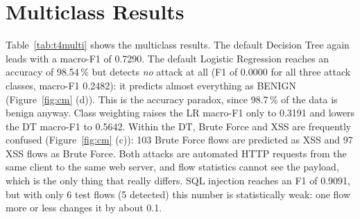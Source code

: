 \begin{table}[ht]
	\centering\small
	\resizebox{\linewidth}{!}{}
	\caption{Binary results on the test split (Prec., Rec., F1 refer to the attack class; FP/FN are false positives and false negatives). Best model in bold.}
	\label{tab:t4binary}
\end{table}

\section{Multiclass Results}\label{sec:ml-multi}

Table~\ref{tab:t4multi} shows the multiclass results. The default Decision Tree again leads with a macro-F1 of 0.7290. The default Logistic Regression reaches an accuracy of 98.54\,\% but detects \emph{no} attack at all (F1 of 0.0000 for all three attack classes, macro-F1 0.2482): it predicts almost everything as BENIGN (Figure~\ref{fig:cm} (d)). This is the accuracy paradox, since 98.7\,\% of the data is benign anyway. Class weighting raises the LR macro-F1 only to 0.3191 and lowers the DT macro-F1 to 0.5642. Within the DT, Brute Force and XSS are frequently confused (Figure~\ref{fig:cm} (c)): 103 Brute Force flows are predicted as XSS and 97 XSS flows as Brute Force. Both attacks are automated HTTP requests from the same client to the same web server, and flow statistics cannot see the payload, which is the only thing that really differs. SQL injection reaches an F1 of 0.9091, but with only 6 test flows (5 detected) this number is statistically weak: one flow more or less changes it by about 0.1.

\begin{table}[ht]
	\centering\small
	\resizebox{\linewidth}{!}{}
	\caption{Multiclass results on the test split. The columns BENIGN to SQLi are per-class F1 scores.}
	\label{tab:t4multi}
\end{table}

